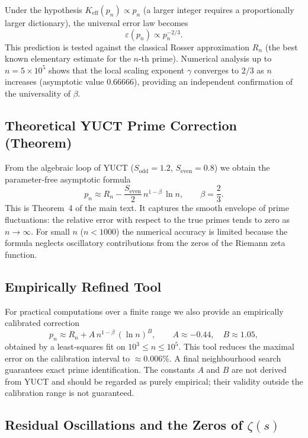 \documentclass[12pt,a4paper]{article}
\begin{document}
	Under the hypothesis \(K_{\mathrm{eff}}(p_n) \propto p_n\) (a larger integer requires a proportionally larger dictionary), the universal error law becomes
	\[
	\varepsilon(p_n) \propto p_n^{-2/3}.
	\]
	This prediction is tested against the classical Rosser approximation \(R_n\) (the best known elementary estimate for the \(n\)-th prime).  Numerical analysis up to \(n = 5\times10^5\) shows that the local scaling exponent \(\gamma\) converges to \(2/3\) as \(n\) increases (asymptotic value \(0.66666\)), providing an independent confirmation of the universality of \(\beta\).
	
	\subsection{Theoretical YUCT Prime Correction (Theorem)}
	
	From the algebraic loop of YUCT (\(S_{\mathrm{odd}}=1.2\), \(S_{\mathrm{even}}=0.8\)) we obtain the parameter‑free asymptotic formula
	\[
	\boxed{p_n \approx R_n - \frac{S_{\mathrm{even}}}{2}\, n^{1-\beta}\,\ln n},
	\qquad \beta = \frac{2}{3}.
	\]
	This is Theorem~4 of the main text.  It captures the smooth envelope of prime fluctuations: the relative error with respect to the true primes tends to zero as \(n\to\infty\).  For small \(n\) (\(n < 1000\)) the numerical accuracy is limited because the formula neglects oscillatory contributions from the zeros of the Riemann zeta function.
	
	\subsection{Empirically Refined Tool}
	
	For practical computations over a finite range we also provide an empirically calibrated correction
	\[
	p_n \approx R_n + A\, n^{1-\beta}\,(\ln n)^B,
	\qquad A \approx -0.44,\quad B \approx 1.05,
	\]
	obtained by a least‑squares fit on \(10^3\le n\le 10^5\).  This tool reduces the maximal error on the calibration interval to \(\approx 0.006\%\).  A final neighbourhood search guarantees exact prime identification.  The constants \(A\) and \(B\) are not derived from YUCT and should be regarded as purely empirical; their validity outside the calibration range is not guaranteed.
	
	\subsection{Residual Oscillations and the Zeros of \(\zeta(s)\)}
	
\end{document}

